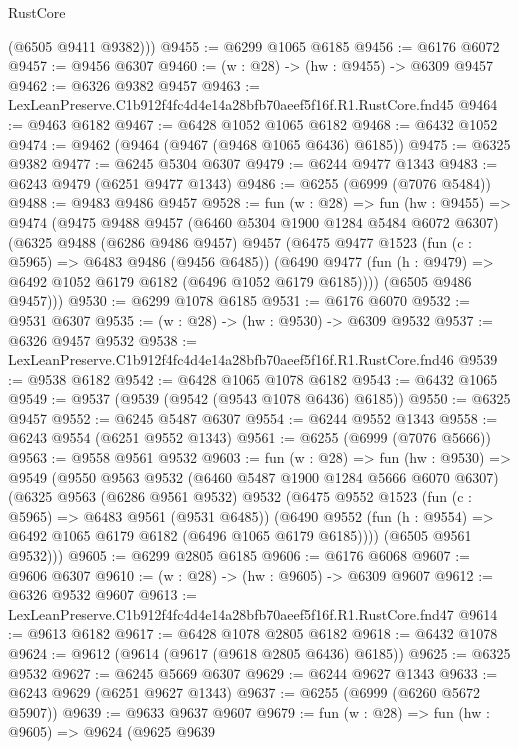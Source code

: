 \begin{lexlean}{RustCore}
\begin{coremodule}
        (@6505 @9411 @9382)))
@9455 := @6299 @1065 @6185
@9456 := @6176 @6072
@9457 := @9456 @6307
@9460 := (w : @28) -> (hw : @9455) -> @6309 @9457
@9462 := @6326 @9382 @9457
@9463 := LexLeanPreserve.C1b912f4fc4d4e14a28bfb70aeef5f16f.R1.RustCore.fnd45
@9464 := @9463 @6182
@9467 := @6428 @1052 @1065 @6182
@9468 := @6432 @1052
@9474 := @9462 (@9464 (@9467 (@9468 @1065 @6436) @6185))
@9475 := @6325 @9382
@9477 := @6245 @5304 @6307
@9479 := @6244 @9477 @1343
@9483 := @6243 @9479 (@6251 @9477 @1343)
@9486 := @6255 (@6999 (@7076 @5484))
@9488 := @9483 @9486 @9457
@9528 := fun (w : @28) =>
  fun (hw : @9455) =>
  @9474
    (@9475
      @9488
      @9457
      (@6460 @5304 @1900 @1284 @5484 @6072 @6307)
      (@6325
        @9488
        (@6286 @9486 @9457)
        @9457
        (@6475
          @9477
          @1523
          (fun (c : @5965) => @6483 @9486 (@9456 @6485))
          (@6490 @9477 (fun (h : @9479) => @6492 @1052 @6179 @6182 (@6496 @1052 @6179 @6185))))
        (@6505 @9486 @9457)))
@9530 := @6299 @1078 @6185
@9531 := @6176 @6070
@9532 := @9531 @6307
@9535 := (w : @28) -> (hw : @9530) -> @6309 @9532
@9537 := @6326 @9457 @9532
@9538 := LexLeanPreserve.C1b912f4fc4d4e14a28bfb70aeef5f16f.R1.RustCore.fnd46
@9539 := @9538 @6182
@9542 := @6428 @1065 @1078 @6182
@9543 := @6432 @1065
@9549 := @9537 (@9539 (@9542 (@9543 @1078 @6436) @6185))
@9550 := @6325 @9457
@9552 := @6245 @5487 @6307
@9554 := @6244 @9552 @1343
@9558 := @6243 @9554 (@6251 @9552 @1343)
@9561 := @6255 (@6999 (@7076 @5666))
@9563 := @9558 @9561 @9532
@9603 := fun (w : @28) =>
  fun (hw : @9530) =>
  @9549
    (@9550
      @9563
      @9532
      (@6460 @5487 @1900 @1284 @5666 @6070 @6307)
      (@6325
        @9563
        (@6286 @9561 @9532)
        @9532
        (@6475
          @9552
          @1523
          (fun (c : @5965) => @6483 @9561 (@9531 @6485))
          (@6490 @9552 (fun (h : @9554) => @6492 @1065 @6179 @6182 (@6496 @1065 @6179 @6185))))
        (@6505 @9561 @9532)))
@9605 := @6299 @2805 @6185
@9606 := @6176 @6068
@9607 := @9606 @6307
@9610 := (w : @28) -> (hw : @9605) -> @6309 @9607
@9612 := @6326 @9532 @9607
@9613 := LexLeanPreserve.C1b912f4fc4d4e14a28bfb70aeef5f16f.R1.RustCore.fnd47
@9614 := @9613 @6182
@9617 := @6428 @1078 @2805 @6182
@9618 := @6432 @1078
@9624 := @9612 (@9614 (@9617 (@9618 @2805 @6436) @6185))
@9625 := @6325 @9532
@9627 := @6245 @5669 @6307
@9629 := @6244 @9627 @1343
@9633 := @6243 @9629 (@6251 @9627 @1343)
@9637 := @6255 (@6999 (@6260 @5672 @5907))
@9639 := @9633 @9637 @9607
@9679 := fun (w : @28) =>
  fun (hw : @9605) =>
  @9624
    (@9625
      @9639

\end{coremodule}
\end{lexlean}
